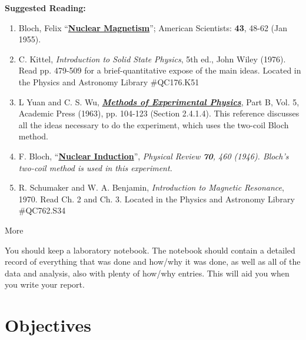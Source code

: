 \documentclass{../lab}
\begin{document}
\textbf{Suggested Reading:}

\begin{enumerate}
    \item Bloch, Felix ``\href{http://physics111.lib.berkeley.edu/Physics111/Reprints/NMR/02-Nuclear\_Magnetism.pdf}{\textbf{Nuclear Magnetism}}''; American Scientists: \textbf{43}, 48-62 (Jan 1955).

    \item C. Kittel, \emph{Introduction to Solid State Physics}, 5th ed., John Wiley (1976). Read pp. 479-509 for a brief-quantitative expose of the main ideas. Located in the Physics and Astronomy Library \#QC176.K51

    \item L Yuan and C. S. Wu, \emph{\href{http://physics111.lib.berkeley.edu/Physics111/Reprints/NMR/01-Methods\_of\_Experimental\_Physics.pdf}{\textbf{Methods of Experimental Physics}}}, Part B, Vol. 5, Academic Press (1963), pp. 104-123 (Section 2.4.1.4). This reference discusses all the ideas necessary to do the experiment, which uses the two-coil Bloch method.

    \item F. Bloch, ``\href{http://prola.aps.org/abstract/PR/v70/i7-8/p460\_1}{\textbf{Nuclear Induction}}'', \emph{Physical Review \textbf{70}, 460 (1946). Bloch's two-coil method is used in this experiment. }

    \item R. Schumaker and W. A. Benjamin, \emph{Introduction to Magnetic Resonance}, 1970. Read Ch. 2 and Ch. 3. Located in the Physics and Astronomy Library \#QC762.S34

\end{enumerate}

More

You should keep a laboratory notebook. The notebook should contain a detailed record of everything that was done and how/why it was done, as well as all of the data and analysis, also with plenty of how/why entries. This will aid you when you write your report.

\section{Objectives}
\end{document}
